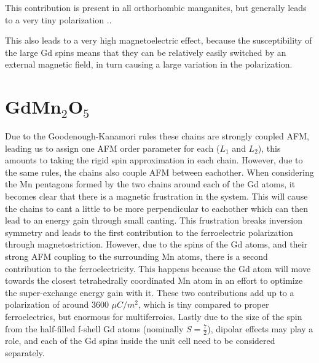 This contribution is present in all orthorhombic manganites, but generally leads to a very tiny polarization \cite{Khomskii2009}..


This also leads to a very high magnetoelectric effect, because the susceptibility of the large Gd spins means that they can be relatively easily switched by an external magnetic field, in turn causing a large variation in the polarization.  
\section{GdMn$_2$O$_5$}
Due to the Goodenough-Kanamori rules these chains are strongly coupled AFM, leading us to assign one AFM order parameter for each ($L_1$ and $L_2$), this amounts to taking the rigid spin approximation in each chain. However, due to the same rules, the chains also couple AFM between eachother. When considering the Mn pentagons formed by the two chains around each of the Gd atoms, it becomes clear that there is a magnetic frustration in the system. This will cause the chains to cant a little to be more perpendicular to eachother which can then lead to an energy gain through small canting. This frustration breaks inversion symmetry and leads to the first contribution to the ferroelectric polarization through magnetostriction. However, due to the spins of the Gd atoms, and their strong AFM coupling to the surrounding Mn atoms, there is a second contribution to the ferroelectricity. This happens because the Gd atom will move towards the closest tetrahedrally coordinated Mn atom in an effort to optimize the super-exchange energy gain with it. These two contributions add up to a polarization of around 3600 $\mu C/m^2$, which is tiny compared to proper ferroelectrics, but enormous for multiferroics. Lastly due to the size of the spin from the half-filled f-shell Gd atoms (nominally $S=\frac{7}{2}$), dipolar effects may play a role, and each of the Gd spins inside the unit cell need to be considered separately. 
\begin{figure}
	\caption{\label{fig:GdMn2O5_unit_cell}}
\end{figure}

